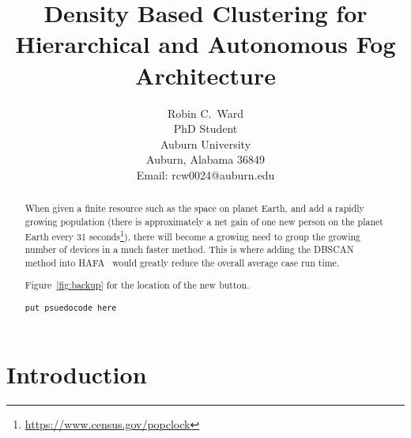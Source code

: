 \documentclass[letterpaper,twocolumn,10pt]{article}
\begin{document}

\date{}

\title{\Large \bf Density Based Clustering for Hierarchical and Autonomous Fog Architecture}

\author{
{\rm Robin C.\ Ward}\\
PhD Student\\
Auburn University\\
Auburn, Alabama 36849\\
Email: rcw0024@auburn.edu\\
} %

\maketitle

\begin{abstract}
When given a finite resource such as the space on planet Earth, and add a rapidly growing population (there is approximately a net gain of one new person on the planet Earth every 31 seconds\footnote{\url{https://www.census.gov/popclock}}), there will become a growing need to group the growing number of devices in a much faster method. This is where adding the DBSCAN method into HAFA~\cite{10.1145/3229710.3229740} would greatly reduce the overall average case run time. 


Figure~\ref{fig:backup} for the location of the new button.

\begin{verbatim}
put psuedocode here
\end{verbatim}

\end{abstract}


\section{Introduction}
\end{document}

